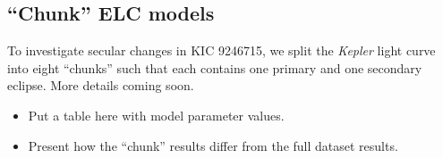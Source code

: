 \subsection{``Chunk'' ELC models}
To investigate secular changes in KIC 9246715, we split the \emph{Kepler} light curve into eight ``chunks'' such that each contains one primary and one secondary eclipse.
More details coming soon.

\begin{itemize}
\item Put a table here with model parameter values.
\item Present how the ``chunk'' results differ from the full dataset results.
\end{itemize}